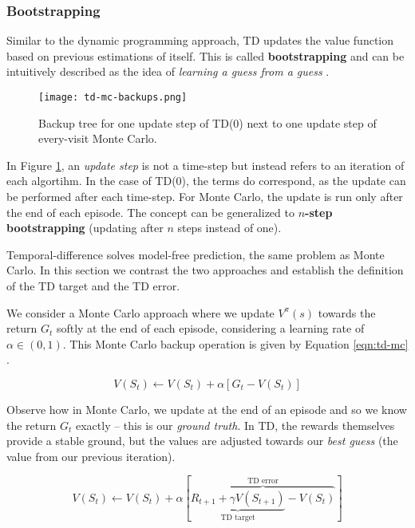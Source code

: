 \subsubsection{Bootstrapping}
Similar to the dynamic programming approach, TD updates the value function based on previous estimations of itself.
This is called \textbf{bootstrapping} and can be intuitively described as the idea of \emph{learning a guess from a guess} \cite{rlai}.

\begin{figure}[h]
    \texttt{[image: td-mc-backups.png]}
    \centering
    \caption{Backup tree for one update step of TD(0) next to one update step of every-visit Monte Carlo.}
    \label{fig:td-mc-update-steps}
\end{figure}

In Figure \ref{fig:td-mc-update-steps}, an \emph{update step} is not a time-step but instead refers to an iteration of each algortihm.
In the case of TD(0), the terms do correspond, as the update can be performed after each time-step.
For Monte Carlo, the update is run only after the end of each episode.
The concept can be generalized to \textbf{$n$-step bootstrapping} (updating after $n$ steps instead of one).

Temporal-difference solves model-free prediction, the same problem as Monte Carlo.
In this section we contrast the two approaches and establish the definition of the TD target and the TD error.

We consider a Monte Carlo approach where we update $V^{\pi}(s)$ towards the return $G_t$ softly at the end of each episode, considering a learning rate of $\alpha \in (0, 1)$.
This Monte Carlo backup operation is given by Equation \ref{eqn:td-mc} \cite{rlai}.

\begin{equation} \label{eqn:td-mc}
    V(S_t) \leftarrow  V(S_t) + \alpha[G_t - V(S_t)]
\end{equation}

Observe how in Monte Carlo, we update at the end of an episode and so we know the return $G_t$ exactly -- this is our \emph{ground truth}.
In TD, the rewards themselves provide a stable ground, but the values are adjusted towards our \emph{best guess} (the value from our previous iteration).

\begin{equation} \label{eqn:td-td}
    V(S_t) \leftarrow  V(S_t) + \alpha[
        \overbrace{\underbrace{R_{t+1} + \gamma V(S_{t+1})}_\text{TD target} - V(S_t)}^\text{TD error}
    ]
\end{equation}

